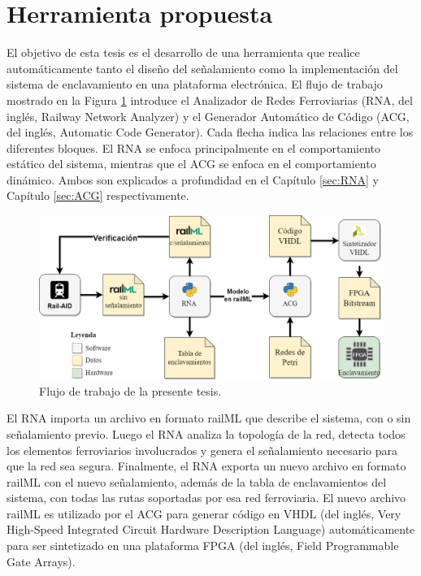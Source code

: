 \section{Herramienta propuesta}

    El objetivo de esta tesis es el desarrollo de una herramienta que realice automáticamente tanto el diseño del señalamiento como la implementación del sistema de enclavamiento en una plataforma electrónica. El flujo de trabajo mostrado en la Figura \ref{fig:workflow} introduce el Analizador de Redes Ferroviarias (RNA, del inglés, Railway Network Analyzer) y el Generador Automático de Código (ACG, del inglés, Automatic Code Generator). Cada flecha indica las relaciones entre los diferentes bloques. El RNA se enfoca principalmente en el comportamiento estático del sistema, mientras que el ACG se enfoca en el comportamiento dinámico. Ambos son explicados a profundidad en el Capítulo \ref{sec:RNA} y Capítulo \ref{sec:ACG} respectivamente.

    \begin{figure}[H]
        \centering
        \includegraphics[width=1\textwidth]{Figuras/workflow.png}
        \centering\caption{Flujo de trabajo de la presente tesis.}
        \label{fig:workflow}
    \end{figure}

    El RNA importa un archivo en formato railML que describe el sistema, con o sin señalamiento previo. Luego el RNA analiza la topología de la red, detecta todos los elementos ferroviarios involucrados y genera el señalamiento necesario para que la red sea segura. Finalmente, el RNA exporta un nuevo archivo en formato railML con el nuevo señalamiento, además de la tabla de enclavamientos del sistema, con todas las rutas soportadas por esa red ferroviaria. El nuevo archivo railML es utilizado por el ACG para generar código en VHDL \cite{Paper_206} (del inglés, Very High-Speed Integrated Circuit Hardware Description Language) automáticamente para ser sintetizado en una plataforma FPGA \cite{Paper_8,Paper_25,Paper_34,Paper_46,Paper_49} (del inglés, Field Programmable Gate Arrays).
    
